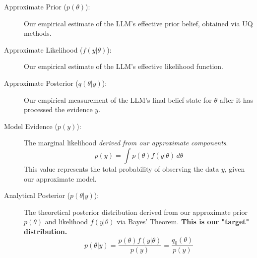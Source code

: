 \documentclass{article}
\theoremstyle{definition}
\begin{document}
\begin{description}
    \item[Approximate Prior ($p(\theta)$):] 
    Our empirical estimate of the LLM's effective prior belief, obtained via UQ methods.
    
    \item[Approximate Likelihood ($f(y|\theta)$):] 
    Our empirical estimate of the LLM's effective likelihood function.
    
    \item[Approximate Posterior ($q(\theta|y)$):]
    Our empirical measurement of the LLM's final belief state for $\theta$ after it has processed the evidence $y$.
    
    
    \item[Model Evidence ($p(y)$):] 
    The marginal likelihood \textit{derived from our approximate components}.
    \begin{equation}
        p(y) = \int p(\theta)f(y|\theta) \, d\theta
    \end{equation}
    This value represents the total probability of observing the data $y$, given our approximate model.
    
    \item[Analytical Posterior ($p(\theta|y)$):] 
    The theoretical posterior distribution derived from our approximate prior $p(\theta)$ and likelihood $f(y|\theta)$ via Bayes' Theorem. \textbf{This is our "target" distribution.}
    \begin{equation}
        p(\theta|y) = \frac{p(\theta)f(y|\theta)}{p(y)} = \frac{q_0(\theta)}{p(y)}
    \end{equation}
\end{description}


    
\end{document}
